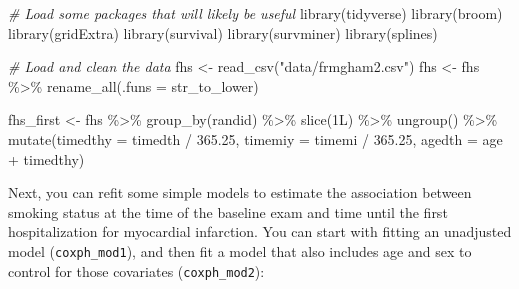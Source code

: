 \documentclass[
]{book}
\newenvironment{Shaded}{\begin{snugshade}}{\end{snugshade}}
\newcommand{\AttributeTok}[1]{\textcolor[rgb]{0.77,0.63,0.00}{#1}}
\newcommand{\CommentTok}[1]{\textcolor[rgb]{0.56,0.35,0.01}{\textit{#1}}}
\newcommand{\FloatTok}[1]{\textcolor[rgb]{0.00,0.00,0.81}{#1}}
\newcommand{\FunctionTok}[1]{\textcolor[rgb]{0.00,0.00,0.00}{#1}}
\newcommand{\NormalTok}[1]{#1}
\newcommand{\OtherTok}[1]{\textcolor[rgb]{0.56,0.35,0.01}{#1}}
\newcommand{\SpecialCharTok}[1]{\textcolor[rgb]{0.00,0.00,0.00}{#1}}
\newcommand{\StringTok}[1]{\textcolor[rgb]{0.31,0.60,0.02}{#1}}
\begin{document}
\begin{Shaded}
\begin{Highlighting}[]
\CommentTok{\# Load some packages that will likely be useful}
\FunctionTok{library}\NormalTok{(tidyverse)}
\FunctionTok{library}\NormalTok{(broom)}
\FunctionTok{library}\NormalTok{(gridExtra)}
\FunctionTok{library}\NormalTok{(survival)}
\FunctionTok{library}\NormalTok{(survminer)}
\FunctionTok{library}\NormalTok{(splines)}

\CommentTok{\# Load and clean the data}
\NormalTok{fhs }\OtherTok{\textless{}{-}} \FunctionTok{read\_csv}\NormalTok{(}\StringTok{"data/frmgham2.csv"}\NormalTok{)}
\NormalTok{fhs }\OtherTok{\textless{}{-}}\NormalTok{ fhs }\SpecialCharTok{\%\textgreater{}\%} 
  \FunctionTok{rename\_all}\NormalTok{(}\AttributeTok{.funs =}\NormalTok{ str\_to\_lower)}

\NormalTok{fhs\_first }\OtherTok{\textless{}{-}}\NormalTok{ fhs }\SpecialCharTok{\%\textgreater{}\%} 
  \FunctionTok{group\_by}\NormalTok{(randid) }\SpecialCharTok{\%\textgreater{}\%} 
  \FunctionTok{slice}\NormalTok{(1L) }\SpecialCharTok{\%\textgreater{}\%} 
  \FunctionTok{ungroup}\NormalTok{() }\SpecialCharTok{\%\textgreater{}\%}
  \FunctionTok{mutate}\NormalTok{(}\AttributeTok{timedthy =}\NormalTok{ timedth }\SpecialCharTok{/} \FloatTok{365.25}\NormalTok{,}
         \AttributeTok{timemiy =}\NormalTok{ timemi }\SpecialCharTok{/} \FloatTok{365.25}\NormalTok{,}
         \AttributeTok{agedth =}\NormalTok{ age }\SpecialCharTok{+}\NormalTok{ timedthy) }
\end{Highlighting}
\end{Shaded}

Next, you can refit some simple models to estimate the association between smoking status at the time of the baseline exam and time until the first hospitalization for myocardial infarction. You can start with fitting an unadjusted model (\texttt{coxph\_mod1}), and then fit a model that also includes age and sex to control for those covariates (\texttt{coxph\_mod2}):
\end{document}
